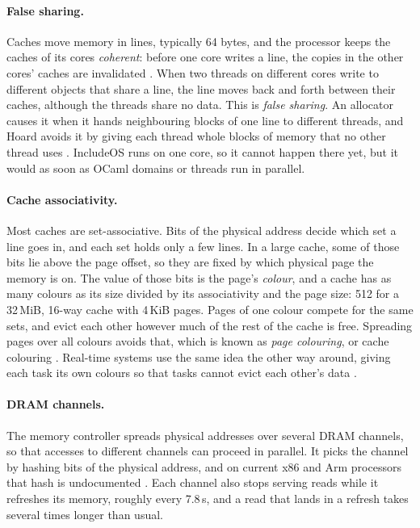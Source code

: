 \documentclass[12pt]{report}
\renewcommand{\_}{\origunderscore\allowbreak}
\begin{document}
\paragraph{False sharing.} Caches move memory in lines, typically 64 bytes, and the processor keeps the caches of its cores \emph{coherent}: before one core writes a line, the copies in the other cores' caches are invalidated \cite{drepper2007memory}. When two threads on different cores write to different objects that share a line, the line moves back and forth between their caches, although the threads share no data. This is \emph{false sharing}. An allocator causes it when it hands neighbouring blocks of one line to different threads, and Hoard avoids it by giving each thread whole blocks of memory that no other thread uses \cite{berger2000hoard}. IncludeOS runs on one core, so it cannot happen there yet, but it would as soon as OCaml domains or threads run in parallel.

\paragraph{Cache associativity.} Most caches are set-associative. Bits of the physical address decide which set a line goes in, and each set holds only a few lines. In a large cache, some of those bits lie above the page offset, so they are fixed by which physical page the memory is on. The value of those bits is the page's \emph{colour}, and a cache has as many colours as its size divided by its associativity and the page size: 512 for a 32\,MiB, 16-way cache with 4\,KiB pages. Pages of one colour compete for the same sets, and evict each other however much of the rest of the cache is free. Spreading pages over all colours avoids that, which is known as \emph{page colouring}, or cache colouring \cite{kessler1992page}. Real-time systems use the same idea the other way around, giving each task its own colours so that tasks cannot evict each other's data \cite{liedtke1997cache}.

\paragraph{DRAM channels.} The memory controller spreads physical addresses over several DRAM channels, so that accesses to different channels can proceed in parallel. It picks the channel by hashing bits of the physical address, and on current x86 and Arm processors that hash is undocumented \cite{lauriewired2026ram}. Each channel also stops serving reads while it refreshes its memory, roughly every 7.8\,\textmu s, and a read that lands in a refresh takes several times longer than usual.
\end{document}
